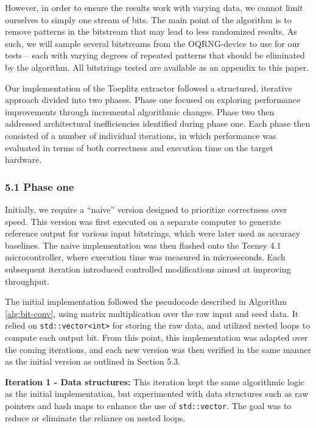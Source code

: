 However, in order to ensure the results work with varying data, we cannot limit ourselves to simply one stream of bits. The main point of the algorithm is to remove patterns in the bitstream that may lead to less randomized results. As such, we will sample several bitstreams from the OQRNG-device to use for our tests -- each with varying degrees of repeated patterns that should be eliminated by the algorithm. All bitstrings tested are available as an appendix to this paper.

Our implementation of the Toeplitz extractor followed a structured, iterative approach divided into two phases. Phase one focused on exploring performance improvements through incremental algorithmic changes. Phase two then addressed architectural inefficiencies identified during phase one. Each phase then consisted of a number of individual iterations, in which performance was evaluated in terms of both correctness and execution time on the target hardware.

\subsubsection{5.1 Phase one}\label{phase-one}

Initially, we require a ``naive'' version designed to prioritize correctness over speed. This version was first executed on a separate computer to generate reference output for various input bitstrings, which were later used as accuracy baselines. The naive implementation was then flashed onto the Teensy 4.1 microcontroller, where execution time was measured in microseconds. Each subsequent iteration introduced controlled modifications aimed at improving throughput.

The initial implementation followed the pseudocode described in Algorithm \ref{alg:bit-conv}, using matrix multiplication over the raw input and seed data. It relied on \texttt{std::vector\textless{}int\textgreater{}} for storing the raw data, and utilized nested loops to compute each output bit. From this point, this implementation was adapted over the coming iterations, and each new version was then verified in the same manner as the initial version as outlined in Section 5.3.

\textbf{Iteration 1 - Data structures:} This iteration kept the same algorithmic logic as the initial implementation, but experimented with data structures such as raw pointers and hash maps to enhance the use of \texttt{std::vector}. The goal was to reduce or eliminate the reliance on nested loops.

